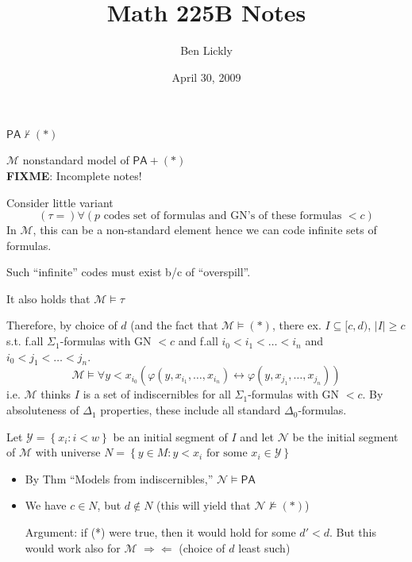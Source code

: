 \documentclass[12pt]{article}
\author{Ben Lickly}
\date{April 30, 2009}
\title{Math 225B Notes}
\newcommand{\PA}{\ensuremath{\mathsf{PA}}}
\newcommand{\proves}{\vdash}
\newcommand{\fixme}{\\ \textbf{FIXME}: Incomplete notes!}
\begin{document}
\maketitle

$\PA \not\proves (*)$

$\mathcal{M}$ nonstandard model of $\PA + (*)$
\fixme

Consider little variant
\[
(\tau = )
\forall (p \text{ codes set of formulas and GN's of these formulas $< c$})
\]
In $\mathcal{M}$, this can be a non-standard element hence we can code
infinite sets of formulas.

Such ``infinite'' codes must exist b/c of ``overspill''.

It also holds that $\mathcal{M} \models \tau$

Therefore, by choice of $d$ (and the fact that $\mathcal{M} \models (*)$,
there ex. $I \subseteq [c,d)$, $|I| \ge c$
s.t. f.all $\Sigma_1$-formulas with GN $< c$
and f.all $i_0 < i_1 < \dots < i_n$ and $i_0 < j_1 < \dots < j_n$.
\[
\mathcal{M} \models \forall y < x_{i_0} \left( \varphi(y,x_{i_1},\dots,x_{i_n})
\leftrightarrow \varphi(y,x_{j_1},\dots,x_{j_n})\right)
\]
i.e. $\mathcal{M}$ thinks $I$ is a set of indiscernibles for all
$\Sigma_1$-formulas with GN $< c$.
By absoluteness of $\Delta_1$ properties, these include all standard $\Delta_0$-formulas.

Let $\mathcal{Y} = \left\{ x_i : i < w \right\}$ be an initial segment of $I$
and let $\mathcal{N}$ be the initial segment of $\mathcal{M}$
with universe $N = \left\{ y\in M : y < x_i \text{ for some } x_i \in \mathcal{Y} \right\}$
\begin{itemize}
  \item By Thm ``Models from indiscernibles,'' $\mathcal{N} \models \PA$
  \item We have $c \in N$, but $d \not\in N$
    (this will yield that $\mathcal{N} \not\models (*)$)

    Argument: if (*) were true, then it would hold for some $d'<d$.
    But this would work also for $\mathcal{M}$
    $\Rightarrow\Leftarrow$ (choice of $d$ least such)
\end{itemize}
\end{document}
